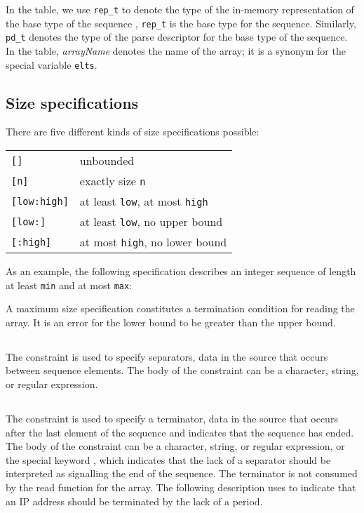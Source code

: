 \noindent
In the table, we use \texttt{rep\_t} to denote the type of the
in-memory representation of the base type of the sequence \ie{},
\texttt{rep\_t} is the base type for the sequence.  Similarly,
\texttt{pd\_t} denotes the type of the parse descriptor for the base
type of the sequence. In the table, \textit{arrayName} denotes the
name of the array; it is a synonym for the special variable \texttt{elts}.


\subsection{Size specifications}
\label{sec:array-size-spec}
There are five different kinds of size specifications possible:
				   
\begin{tabular}{ll}
  \texttt{[]}         & unbounded \\
  \texttt{[n]}        & exactly size \texttt{n}\\
  \texttt{[low:high]} & at least \texttt{low}, at most \texttt{high}\\
  \texttt{[low:]}     & at least \texttt{low}, no upper bound\\
  \texttt{[:high]}    & at most  \texttt{high}, no lower bound\\
\end{tabular}

\noindent
As an example, the following specification describes an integer
sequence of length at least \texttt{min} and at most \texttt{max}:



A maximum size specification constitutes a termination condition for
reading the array.  It is an error for the lower bound to be greater
than the upper bound.

\subsection{\Psep}
The \Psep{} constraint is used to specify separators, \ie{} data in
the source that occurs between sequence elements.  The body of the
\Psep{} constraint can be a character, string, or regular expression. 

\subsection{\Pterm}
The \Pterm{} constraint is used to specify a terminator, \ie{} data in
the source that occurs after the last element of the sequence and
indicates that the sequence has ended.  The body of the \Pterm{}
constraint can be a character, string, or regular expression, or the
special keyword \Pnosep{}, which indicates that the lack of a
separator should be interpreted as signalling the end of the
sequence.   The terminator is not consumed by the read function for
the array.  The following description uses \Pnosep{} to indicate that
an IP address should be terminated by the lack of a period.


